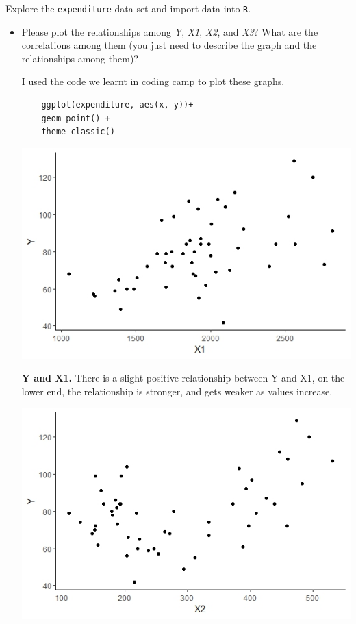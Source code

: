 \documentclass[12pt,letterpaper]{article}
\begin{document}
\vspace{.5cm}
\noindent Explore the \texttt{expenditure} data set and import data into \texttt{R}.
\vspace{.5cm}
  
\vspace{.5cm}
\begin{itemize}

\item
Please plot the relationships among \emph{Y}, \emph{X1}, \emph{X2}, and \emph{X3}? What are the correlations among them (you just need to describe the graph and the relationships among them)?

I used the code we learnt in coding camp to plot these graphs.
\begin{verbatim}
	ggplot(expenditure, aes(x, y))+
	geom_point() +
	theme_classic()
\end{verbatim}


\includegraphics{YandX1}

\textbf{Y and X1.} There is a slight positive relationship between Y and X1, on the lower end, the relationship is stronger, and gets weaker as values increase.
\vspace{.5cm}

\includegraphics{YandX2}


\end{itemize}
\end{document}
